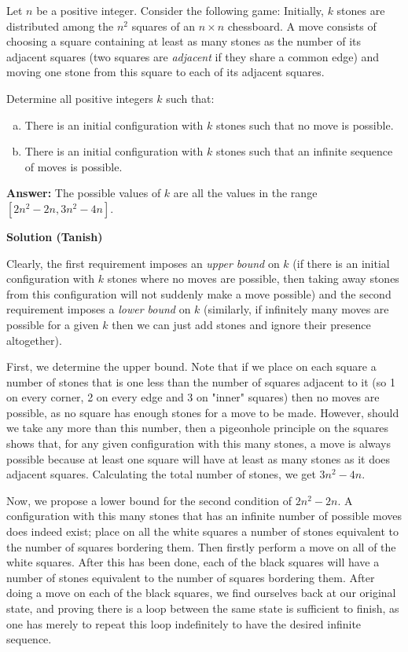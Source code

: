 Let $n$ be a positive integer. Consider the following game: Initially, $k$ stones are distributed among the $n^2$ squares of an $n\times n$ chessboard. A move consists of choosing a square containing at least as many stones as the number of its adjacent squares (two squares are \textit{adjacent} if they share a common edge) and moving one stone from this square to each of its adjacent squares.

Determine all positive integers $k$ such that:
\begin{enumerate}[(a)]
\item There is an initial configuration with $k$ stones such that no move is possible.
\item There is an initial configuration with $k$ stones such that an infinite sequence of moves is possible.
\end{enumerate}

\textbf{Answer:} The possible values of $k$ are all the values in the range $[2n^2 - 2n, 3n^2-4n]$.

\textbf{Solution (Tanish)}

Clearly, the first requirement imposes an \emph{upper bound} on $k$ (if there is an initial configuration with $k$ stones where no moves are possible, then taking away stones from this configuration will not suddenly make a move possible) and the second requirement imposes a \emph{lower bound} on $k$ (similarly, if infinitely many moves are possible for a given $k$ then we can just add stones and ignore their presence altogether).

First, we determine the upper bound. Note that if we place on each square a number of stones that is one less than the number of squares adjacent to it (so 1 on every corner, 2 on every edge and 3 on "inner" squares) then no moves are possible, as no square has enough stones for a move to be made. However, should we take any more than this number, then a pigeonhole principle on the squares shows that, for any given configuration with this many stones, a move is always possible because at least one square will have at least as many stones as it does adjacent squares. Calculating the total number of stones, we get $3n^2-4n$.

Now, we propose a lower bound for the second condition of $2n^2-2n$. A configuration with this many stones that has an infinite number of possible moves does indeed exist; place on all the white squares a number of stones equivalent to the number of squares bordering them. Then firstly perform a move on all of the white squares. After this has been done, each of the black squares will have a number of stones equivalent to the number of squares bordering them. After doing a move on each of the black squares, we find ourselves back at our original state, and proving there is a loop between the same state is sufficient to finish, as one has merely to repeat this loop indefinitely to have the desired infinite sequence. 

